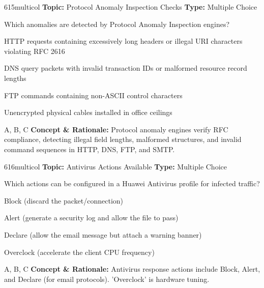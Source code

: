 \begin{qcard}{615}{multicol}
\textcolor{darkslate!75}{\small\textbf{Topic:} Protocol Anomaly Inspection Checks \hfill \textbf{Type:} Multiple Choice}\vspace{0.4em}\par
Which anomalies are detected by Protocol Anomaly Inspection engines?
\begin{qoptions}
\item HTTP requests containing excessively long headers or illegal URI characters violating RFC 2616
\item DNS query packets with invalid transaction IDs or malformed resource record lengths
\item FTP commands containing non-ASCII control characters
\item Unencrypted physical cables installed in office ceilings
\end{qoptions}
\end{qcard}
\nopagebreak
\begin{explainbox}{A, B, C}
\textbf{Concept \& Rationale:} Protocol anomaly engines verify RFC compliance, detecting illegal field lengths, malformed structures, and invalid command sequences in HTTP, DNS, FTP, and SMTP.
\end{explainbox}

\begin{qcard}{616}{multicol}
\textcolor{darkslate!75}{\small\textbf{Topic:} Antivirus Actions Available \hfill \textbf{Type:} Multiple Choice}\vspace{0.4em}\par
Which actions can be configured in a Huawei Antivirus profile for infected traffic?
\begin{qoptions}
\item Block (discard the packet/connection)
\item Alert (generate a security log and allow the file to pass)
\item Declare (allow the email message but attach a warning banner)
\item Overclock (accelerate the client CPU frequency)
\end{qoptions}
\end{qcard}
\nopagebreak
\begin{explainbox}{A, B, C}
\textbf{Concept \& Rationale:} Antivirus response actions include Block, Alert, and Declare (for email protocols). 'Overclock' is hardware tuning.
\end{explainbox}

